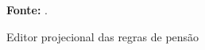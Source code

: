 \begin{figure}[ht!]
\centering

\caption{\textmd{Editor projecional das regras de pensão}}
\label{fig:dslcapgeminitables}

\par\medskip\textbf{Fonte:} . \par\medskip

\end{figure}

